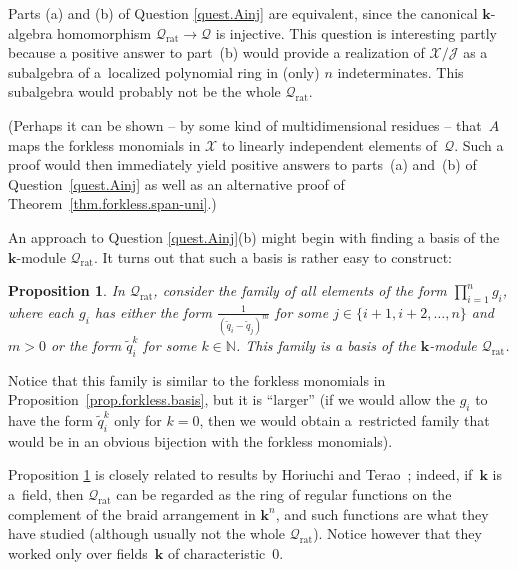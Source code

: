 \documentclass[pdftex]{sigma}
\newtheorem{Proposition}[Theorem]{Proposition}
\numberwithin{equation}{section}
\let\prodnonlimits\prod
\renewcommand{\prod}{\prodnonlimits\limits}
\begin{document}
Parts (a) and (b) of Question \ref{quest.Ainj} are equivalent, since the canonical $\mathbf{k}$-algebra homomorphism $\mathcal{Q}_{\operatorname*{rat}}\rightarrow\mathcal{Q}$ is injective. This question is interesting partly because a positive answer to part~(b) would provide a realization of $\mathcal{X}/\mathcal{J}$ as a subalgebra of a~localized polynomial ring in (only) $n$ indeterminates. This subalgebra would probably not be the whole $\mathcal{Q}_{\operatorname*{rat}}$.

(Perhaps it can be shown -- by some kind of multidimensional residues -- that~$A$ maps the forkless monomials in $\mathcal{X}$ to linearly independent elements of~$\mathcal{Q}$. Such a proof would then immediately yield positive answers to parts~(a) and~(b) of Question~\ref{quest.Ainj} as well as an alternative proof of Theorem~\ref{thm.forkless.span-uni}.)

An approach to Question \ref{quest.Ainj}(b) might begin with finding a basis of the $\mathbf{k}$-module $\mathcal{Q}_{\operatorname*{rat}}$. It
turns out that such a basis is rather easy to construct:

\begin{Proposition}\label{prop.Qrat.basis}In $\mathcal{Q}_{\operatorname*{rat}}$, consider the family of all elements of the form $\prod_{i=1}^{n}g_{i}$, where each $g_{i}$ has either the form $\frac{1}{( \widetilde{q}_{i}-\widetilde{q}_{j}) ^{m}}$ for some $j\in\{ i+1,i+2,\ldots,n\} $ and $m>0$ or the form $\widetilde{q}_{i}^{k}$ for some $k\in\mathbb{N}$. This family is a basis of the $\mathbf{k}$-module $\mathcal{Q}_{\operatorname*{rat}}$.
\end{Proposition}

Notice that this family is similar to the forkless monomials in Proposition~\ref{prop.forkless.basis}, but it is ``larger'' (if we would allow the $g_{i}$ to have the form $\widetilde{q}_{i}^{k}$ only for $k=0$, then we would obtain a~restricted family that would be in an obvious bijection with the forkless monomials).

Proposition \ref{prop.Qrat.basis} is closely related to results by Horiuchi and Terao~\cite{HorTer03,Terao02}; indeed, if~$\mathbf{k}$ is a~field, then $\mathcal{Q}_{\operatorname*{rat}}$ can be regarded as the ring of regular functions on the complement of the braid arrangement in $\mathbf{k}^{n}$, and such functions are what they have studied (although usually not the whole $\mathcal{Q}_{\operatorname*{rat}}$). Notice however that they worked only over fields~$\mathbf{k}$ of characteristic~$0$.
\end{document}
